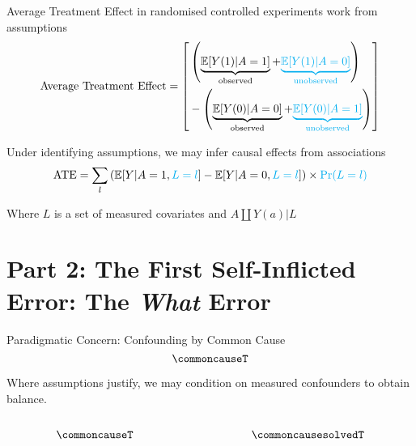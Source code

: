 \documentclass[
  ignorenonframetext,
  aspectratio=169,
  xcolor=\{dvipsnames\}]{beamer}
\begin{document}
\begin{frame}{Average Treatment Effect in randomised controlled
experiments work from assumptions}
\label{average-treatment-effect-in-randomised-controlled-experiments-work-from-assumptions}
\[
\text{Average Treatment Effect} = \left[ \begin{aligned}
&\left( \underbrace{\mathbb{E}[Y(1)|A = 1]}_{\text{observed}} + \textcolor{cyan}{\underbrace{\mathbb{E}[Y(1)|A = 0]}_{\text{unobserved}}} \right) \\
&- \left( \underbrace{\mathbb{E}[Y(0)|A = 0]}_{\text{observed}} + \textcolor{cyan}{\underbrace{\mathbb{E}[Y(0)|A = 1]}_{\text{unobserved}}} \right)
\end{aligned} \right]
\]
\end{frame}

\begin{frame}{Under identifying assumptions, we may infer causal effects
from associations}
\label{under-identifying-assumptions-we-may-infer-causal-effects-from-associations}
\[
\text{ATE} = \sum_{l} \left( \mathbb{E}[Y|A=1, \textcolor{cyan}{L=l}] - \mathbb{E}[Y|A=0, \textcolor{cyan}{L=l}] \right) \times \textcolor{cyan}{\Pr(L=l)}
\]

Where \(L\) is a set of measured covariates and \(A\coprod Y(a)|L\)
\end{frame}

\section{\texorpdfstring{\textbf{Part 2: The First Self-Inflicted Error:
The \emph{What}
Error}}{Part 2: The First Self-Inflicted Error: The What Error}}\label{part-2-the-first-self-inflicted-error-the-what-error}

\begin{frame}{Paradigmatic Concern: Confounding by Common Cause}
\label{paradigmatic-concern-confounding-by-common-cause}
\[\commoncauseT\]
\end{frame}

\begin{frame}{Where assumptions justify, we may condition on measured
confounders to obtain balance.}
\label{where-assumptions-justify-we-may-condition-on-measured-confounders-to-obtain-balance.}
\begin{columns}[T]
\begin{column}{0.5\linewidth}
\[
\commoncauseT
\]
\end{column}

\begin{column}{0.5\linewidth}
\[
\commoncausesolvedT
\]
\end{column}
\end{columns}
\end{frame}
\end{document}
